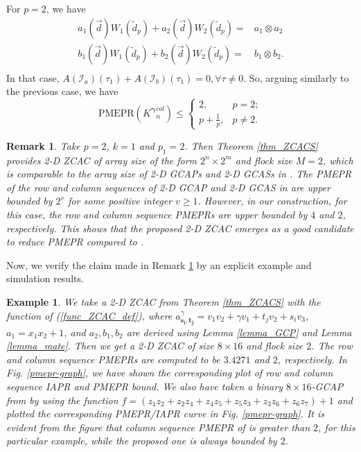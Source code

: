 \documentclass[pdflatex,sn-mathphys-num]{sn-jnl}%
\theoremstyle{thmstyleone}
\newtheorem{example}{Example}
\newtheorem{remark}{Remark}
\begin{document}
	For $p=2$, we have 
	\begin{equation}
		\begin{split}
			a_1(\vec{d}) W_1(\tilde{d}_p) + a_2(\vec{d}) W_2(\tilde{d}_p)=& a_1 \otimes a_2\\
			b_1(\vec{d}) W_1(\tilde{d}_p)+ b_2(\vec{d}) W_2(\tilde{d}_p)=& b_1\otimes b_2.\\
		\end{split}
	\end{equation}
	In that case, $A( \mathcal{I}_a)(\tau_1) + A( \mathcal{I}_b)(\tau_1)=0, \forall \tau \neq 0$.
	So, arguing similarly to the previous case, we have
	\begin{equation}
		\text{PMEPR}({K^{\bm{\gamma}}}^{col}_n) \leq
		\begin{cases}
			2, & p=2;\\
			p+ \frac{1}{p}, & p \neq 2.
		\end{cases}
	\end{equation}
	
	\begin{remark}\label{remark_PMEPR}
		Take $p=2$, $k=1$ and $p_1=2$. Then Theorem \ref{thm_ZCACS} provides 2-D ZCAC of array size of the form $2^n \times 2^m$ and flock size $M=2$, which is comparable to the array size of 2-D GCAPs and 2-D GCASs in  \cite[Th.~12]{pai2021twodimensional}. The PMEPR of the row and column sequences of 2-D GCAP and 2-D GCAS in \cite{pai2021twodimensional} are upper bounded by $2^v$ for some positive integer $v \geq 1$. However, in our construction, for this case, the row and column sequence PMEPRs are upper bounded by $4$ and $2$, respectively. 
		This shows that the proposed 2-D ZCAC emerges as a good candidate to reduce PMEPR compared to \cite{pai2021twodimensional}.
	\end{remark}
	
	Now, we verify the claim made in Remark \ref{remark_PMEPR} by an explicit example and simulation results.
	\begin{example}
		We take a 2-D ZCAC from Theorem \ref{thm_ZCACS} with the function of (\ref{func_ZCAC_def}), where $a_{\mathbf{s_i},\mathbf{t_j}}^\gamma= v_1 v_2 + \gamma v_1 + t_j  v_2+  s_i  v_3 $, $a_1= x_1 x_2 +1$, and $a_2, b_1, b_2$ are derived using Lemma \ref{lemma_GCP} and Lemma \ref{lemma_mate}.
		Then we get a 2-D ZCAC of size $8 \times 16$ and flock size $2$. The row and column sequence PMEPRs are computed to be $3.4271$ and $2$, respectively.  In Fig. \ref{pmepr-graph}, we have shown the corresponding plot of row and column sequence IAPR and PMEPR bound. We also have taken a binary $8 \times 16$-GCAP from \cite{pai2021twodimensional} by using the function $f= (z_1 z_2+  z_2 z_4+  z_4 z_5+ z_5 z_3+ z_3 z_6+ z_6 z_7)+1$ and plotted the corresponding PMEPR/IAPR curve in Fig. \ref{pmepr-graph}. It is evident from the figure that column sequence PMEPR of \cite{pai2021twodimensional} is greater than $2$, for this particular example, while the proposed one is always bounded by $2$.
	\end{example}
	
\end{document}
